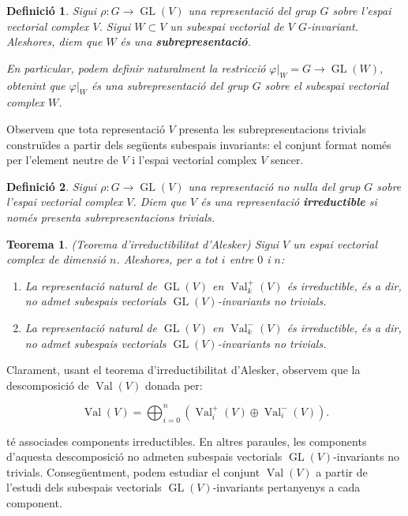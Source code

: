 \documentclass{article}
\newtheorem{teorema}{Teorema}
\newtheorem{definicio}{Definici\'{o}}
\theoremstyle{definition}
\DeclareMathOperator{\Val}{Val}
\DeclareMathOperator{\GL}{GL}
\begin{document}
\begin{definicio}\label{Def:subrepresentacio}
Sigui $\rho: G \longrightarrow \GL(V)$ una representaci\'{o} del grup $G$ sobre l'espai vectorial complex $V$. Sigui $W \subset V$ un subespai vectorial de $V$ $G$-invariant. Aleshores, diem que $W$ \'{e}s una \textbf{subrepresentaci\'{o}}.

En particular, podem definir naturalment la restricci\'{o} $\varphi |_{W} = G \longrightarrow \GL(W)$, obtenint que $\varphi |_{W}$ \'{e}s una subrepresentaci\'{o} del grup $G$ sobre el subespai vectorial complex $W$.
\end{definicio}

Observem que tota representaci\'{o} $V$ presenta les subrepresentacions trivials constru\"{i}des a partir dels seg\"{u}ents subespais invariants: el conjunt format nom\'{e}s per l'element neutre  de $V$ i l'espai vectorial complex $V$ sencer.

\begin{definicio}\label{Def:irreductible}
Sigui $\rho: G \longrightarrow \GL(V)$ una representaci\'{o} no nul\textperiodcentered la del grup $G$ sobre l'espai vectorial complex $V$. Diem que $V$ \'{e}s una representaci\'{o} \textbf{irreductible} si nom\'{e}s presenta subrepresentacions trivials.
\end{definicio}

\begin{teorema}
(Teorema d'irreductibilitat d'Alesker) Sigui $V$ un espai vectorial complex de dimensi\'{o} $n$. Aleshores, per a tot $i$ entre $0$ i $n$:

\begin{enumerate}
    \item La representaci\'{o} natural de $\GL(V)$ en $\Val_k^+(V)$ \'{e}s irreductible, \'{e}s a dir, no admet subespais vectorials $\GL(V)$-invariants no trivials.
    \item La representaci\'{o} natural de $\GL(V)$ en $\Val_k^-(V)$ \'{e}s irreductible, \'{e}s a dir, no admet subespais vectorials $\GL(V)$-invariants no trivials.
\end{enumerate}
\end{teorema}

Clarament, usant el teorema d'irreductibilitat d'Alesker, observem que la descomposici\'{o} de $\Val(V)$ donada per:

\[ \Val(V) = \bigoplus^n_{i=0} ( \Val_i^+(V) \oplus \Val_i^-(V)).\]

t\'{e} associades components irreductibles. En altres paraules, les components d'aquesta descomposici\'{o} no admeten subespais vectorials $\GL(V)$-invariants no trivials. Conseg\"{u}entment, podem estudiar el conjunt $\Val(V)$ a partir de l'estudi dels subespais vectorials $\GL(V)$-invariants pertanyenys a cada component.
\end{document}
